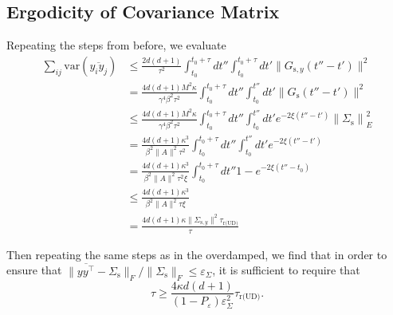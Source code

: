 \documentclass[prx,onecolumn,floatfix,longbibliography,notitlepage, nofootinbib,12pt]{revtex4-2}
\renewcommand{\geq}{\geqslant}
\renewcommand{\leq}{\leqslant}
\begin{document}
\begin{appendix}
\subsection{Ergodicity of Covariance Matrix}
Repeating the steps from before, we evaluate 
\begin{align}
    \sum_{ij}\text{var}(\overline{y_i y_j})
    &\leq \frac{2d(d+1)}{\tau^2}\int_{t_0}^{t_0 + \tau} dt'' \int_{t_0}^{t_0 + \tau} dt'\|G_{\text{s},y}(t'' - t')\|^2\\
    & =  \frac{4d(d+1)M^2\kappa}{\gamma^4 \beta^2 \tau^2}\int_{t_0}^{t_0 + \tau} dt'' \int_{t_0}^{t''} dt'\|G_\text{s}(t'' - t')\|^2 \\ 
    & \leq \frac{4d(d+1)M^2\kappa}{\gamma^4 \beta^2 \tau^2} \int_{t_0}^{t_0 + \tau} dt'' \int_{t_0}^{t''} dt'e^{-2\xi(t''-t')} \left\| \Sigma_\text{s}\right\|_E^2 \\
    &=
\frac{4d(d+1)\kappa^3}{\beta^2\|A\|^2 \tau^2 } \int_{t_0}^{t_0 + \tau} dt'' \int_{t_0}^{t''} dt'e^{-2\xi(t''-t')}  \\
    &=
\frac{4d(d+1)\kappa^3}{\beta^2  \|A\|^2\tau^2 \xi} \int_{t_0}^{t_0 + \tau}dt'' 1 - e^{-2\xi(t''-t_0)}\\ 
& \leq \frac{4d(d+1)\kappa^3}{\beta^2  \|A\|^2\tau \xi} \\
& = \frac{4d(d+1)\kappa \|\Sigma_{\text{s},y}\|^2\tau_{\text{r(UD)}}}{\tau }
\end{align}

Then repeating the same steps as in the overdamped, we find that in order to ensure that $\|\overline{y y^\intercal} - \Sigma_\text{s}\|_F/\|\Sigma_\text{s}\|_F \leq \varepsilon_\Sigma$, it is sufficient to require that
\begin{equation}
    \tau \geq \frac{4 \kappa d(d+1)}{(1-P_\varepsilon)\varepsilon_\Sigma^2}\tau_\text{r(UD)}.
\end{equation}


\end{appendix}
\end{document}
